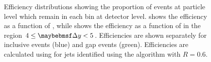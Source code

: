 \begin{figure}[htpb]
{    \label{fig:azimuthal-decorrelation:efficiency_dPhi}}
  \caption{Efficiency distributions showing the proportion of events at particle level
           which remain in each bin at detector level. \protect{}
           shows the efficiency as a function of \DeltaY, while \protect{}
           shows the efficiency as a function of \DeltaPhi in the region $4 \leq \DeltaY < 5$.
           Efficiencies are shown separately for inclusive events (blue) and gap events (green). Efficiencies are
           calculated using \Pythia \MC for jets identified using the \akt algorithm
           with $R=0.6$.}
  \label{fig:azimuthal-decorrelation:efficiencies}
\end{figure}

\begin{figure}[htpb]
  \quad
\end{figure}
